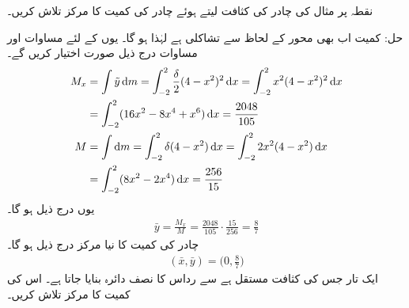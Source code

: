نقطہ  پر مثال  کی چادر کی کثافت  لیتے ہوئے چادر کی کمیت کا مرکز تلاش کریں۔

حل:\quad
کمیت اب بھی محور  کے لحاظ سے تشاکلی ہے لہٰذا  ہو گا۔ یوں  کے لئے مساوات  اور مساوات  درج ذیل صورت اختیار کریں گے۔
\begin{align*}
M_x&=\int\tilde{y}\dif m=\int_{-2}^2\frac{\delta}{2}(4-x^2)^2\dif x=\int_{-2}^2x^2(4-x^2)^2\dif x\\
&=\int_{-2}^2(16x^2-8x^4+x^6)\dif x=\frac{2048}{105}\\
M&=\int\dif m=\int_{-2}^2\delta(4-x^2)\dif x=\int_{-2}^22x^2(4-x^2)\dif x\\
&=\int_{-2}^2(8x^2-2x^4)\dif x=\frac{256}{15}
\end{align*}
یوں درج ذیل ہو گا۔
\begin{align*}
\bar{y}=\frac{M_x}{M}=\frac{2048}{105}\cdot\frac{15}{256}=\frac{8}{7}
\end{align*}
چادر کی کمیت کا نیا مرکز درج ذیل ہو گا۔
\begin{align*}
(\bar{x},\bar{y})=\big(0,\frac{8}{7}\big)
\end{align*}
ایک تار جس کی کثافت  مستقل ہے سے  رداس  کا نصف دائرہ بنایا جاتا ہے۔ اس کی کمیت کا مرکز تلاش کریں۔

